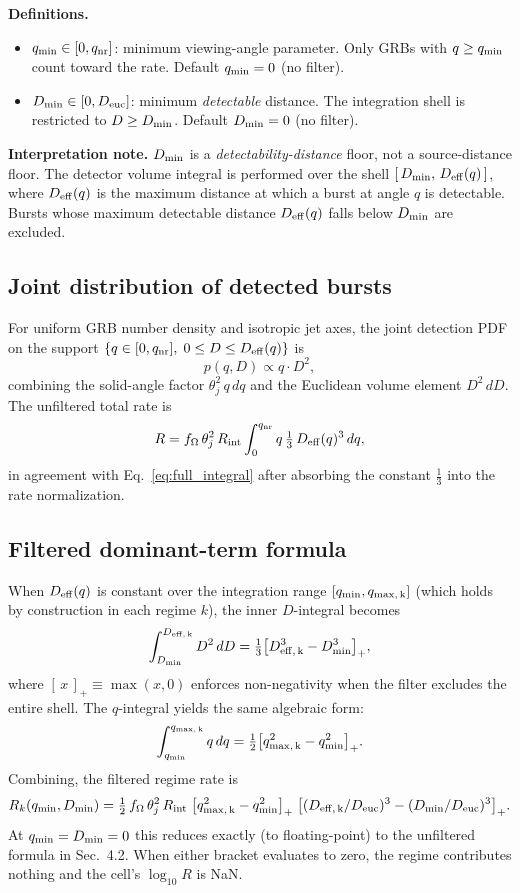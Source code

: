 \documentclass[11pt,a4paper]{article}
\begin{document}
\medskip\noindent\textbf{Definitions.}
\begin{itemize}
\item $q_{\rm min}\in[0,q_{\rm nr}]$: minimum viewing-angle parameter. Only GRBs with $q\ge q_{\rm min}$ count toward the rate. Default $q_{\rm min}=0$ (no filter).
\item $D_{\rm min}\in[0,D_{\rm euc}]$: minimum \emph{detectable} distance. The integration shell is restricted to $D\ge D_{\rm min}$. Default $D_{\rm min}=0$ (no filter).
\end{itemize}

\medskip\noindent\textbf{Interpretation note.} $D_{\rm min}$ is a \emph{detectability-distance} floor, not a source-distance floor. The detector volume integral is performed over the shell $[\,D_{\rm min},\,D_{\rm eff}(q)\,]$, where $D_{\rm eff}(q)$ is the maximum distance at which a burst at angle $q$ is detectable.
Bursts whose maximum detectable distance $D_{\rm eff}(q)$ falls below $D_{\rm min}$ are excluded.

\subsection{Joint distribution of detected bursts}

For uniform GRB number density and isotropic jet axes, the joint detection PDF on the support
$\{q\in[0,q_{\rm nr}],\;0\le D\le D_{\rm eff}(q)\}$ is
\[
p(q,D)\propto q\cdot D^2,
\]
combining the solid-angle factor $\theta_j^2\,q\,dq$ and the Euclidean volume element $D^2\,dD$.
The unfiltered total rate is
\[
R = f_\Omega\,\theta_j^2\,R_{\rm int}\int_0^{q_{\rm nr}} q\,\tfrac{1}{3}\,D_{\rm eff}(q)^3\,dq,
\]
in agreement with Eq.~\eqref{eq:full_integral} after absorbing the constant $\tfrac{1}{3}$ into the rate normalization.

\subsection{Filtered dominant-term formula}

When $D_{\rm eff}(q)$ is constant over the integration range $[q_{\rm min},q_{\rm max,\,k}]$ (which holds by construction in each regime $k$), the inner $D$-integral becomes
\[
\int_{D_{\rm min}}^{D_{\rm eff,\,k}} D^2\,dD = \tfrac{1}{3}\bigl[D_{\rm eff,\,k}^3 - D_{\rm min}^3\bigr]_+,
\]
where $[\,x\,]_+\equiv\max(x,0)$ enforces non-negativity when the filter excludes the entire shell.
The $q$-integral yields the same algebraic form:
\[
\int_{q_{\rm min}}^{q_{\rm max,\,k}} q\,dq = \tfrac{1}{2}\bigl[q_{\rm max,\,k}^2 - q_{\rm min}^2\bigr]_+.
\]
Combining, the filtered regime rate is
\begin{equation}
\label{eq:filter_dominant}
R_k(q_{\rm min},D_{\rm min}) = \tfrac{1}{2}\,f_\Omega\,\theta_j^2\,R_{\rm int}\;\bigl[q_{\rm max,\,k}^2 - q_{\rm min}^2\bigr]_+\;\bigl[(D_{\rm eff,\,k}/D_{\rm euc})^3 - (D_{\rm min}/D_{\rm euc})^3\bigr]_+.
\end{equation}
At $q_{\rm min}=D_{\rm min}=0$ this reduces exactly (to floating-point) to the unfiltered formula in Sec.~4.2. When either bracket evaluates to zero, the regime contributes nothing and the cell's $\log_{10}R$ is NaN.
\end{document}

